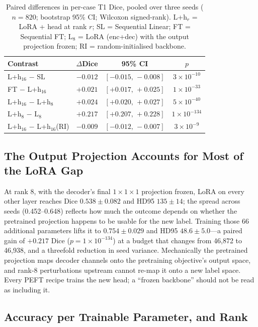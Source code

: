 \documentclass[journal,twoside,web]{ieeecolor}
\begin{document}
\begin{table}[t]
\caption{Paired differences in per-case T1 Dice, pooled over three seeds ($n=820$; bootstrap 95\% CI; Wilcoxon signed-rank). L+h$_r$ = LoRA + head at rank $r$; SL = Sequential Linear; FT = Sequential FT; L$_8$ = LoRA (enc+dec) with the output projection frozen; RI = random-initialised backbone.}
\label{tab:paired}
\centering
\footnotesize
\setlength{\tabcolsep}{4pt}
\begin{tabular}{lccc}
\toprule
Contrast & $\Delta$Dice & 95\% CI & $p$ \\
\midrule
L+h$_{16}$ $-$ SL           & $-0.012$ & $[-0.015,\,-0.008]$ & $3{\times}10^{-10}$ \\
FT $-$ L+h$_{16}$           & $+0.021$ & $[+0.017,\,+0.025]$ & $1{\times}10^{-33}$ \\
L+h$_{16}$ $-$ L+h$_{8}$    & $+0.024$ & $[+0.020,\,+0.027]$ & $5{\times}10^{-40}$ \\
L+h$_{8}$ $-$ L$_{8}$       & $+0.217$ & $[+0.207,\,+0.228]$ & $1{\times}10^{-134}$ \\
L+h$_{16}$ $-$ L+h$_{16}$(RI) & $-0.009$ & $[-0.012,\,-0.007]$ & $3{\times}10^{-9}$ \\
\bottomrule
\end{tabular}
\end{table}

\subsection{The Output Projection Accounts for Most of the LoRA Gap}
\label{sec:res_head}

At rank 8, with the decoder's final $1{\times}1{\times}1$ projection frozen, LoRA on every other layer reaches Dice $0.538\pm0.082$ and HD95 $135\pm14$; the spread across seeds (0.452--0.648) reflects how much the outcome depends on whether the pretrained projection happens to be usable for the new label. Training those 66 additional parameters lifts it to $0.754\pm0.029$ and HD95 $48.6\pm5.0$---a paired gain of $+0.217$ Dice ($p=1{\times}10^{-134}$) at a budget that changes from 46,872 to 46,938, and a threefold reduction in seed variance. Mechanically the pretrained projection maps decoder channels onto the pretraining objective's output space, and rank-8 perturbations upstream cannot re-map it onto a new label space. Every PEFT recipe trains the new head; a ``frozen backbone'' should not be read as including it.

\subsection{Accuracy per Trainable Parameter, and Rank}
\label{sec:res_rank}
\end{document}

